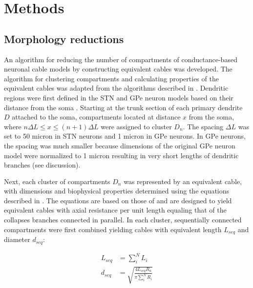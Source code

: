 %
%
%

%
%
%
%
%
%
%
%

%
%
%
%
%
%
%

%
%
%
%
%
%
%
%
%
%
%
%

%
%
%
%
%
%
%
%
%
%
%
%

%
%
%
\section{Methods}
%
%

%
%
%

\subsection{Morphology reductions}

%
%
%
%
%
%
%
%
%


An algorithm for reducing the number of compartments of conductance-based
neuronal cable models by constructing equivalent cables was developed.
The algorithm for clustering compartments and calculating properties
of the equivalent cables was adapted from the algorithms described in
\cite{bush_reduced_1993,marasco_fast_2012,douglas1992exploring}.
%
Dendritic regions were first defined in the STN and GPe neuron models based
on their distance from the soma \cite{douglas1992exploring}. Starting at the trunk section of each
primary dendrite $D$ attached to the soma, compartments located at distance $x$ from the
soma, where $ n \Delta L \leq x \le (n+1) \Delta L $ were assigned to cluster $D_n$.
The spacing $\Delta L$ was set to 50 micron in STN neurons and 1 micron in GPe neurons.
In GPe neurons, the spacing was much smaller because dimensions of the original
\cite{gunay_channel_2008} GPe neuron model were normalized to 1 micron resulting
in very short lengths of dendritic branches (see discussion).
%

%
%
%
%
%
%
%
%
%
%
%
%
%
%
%
%
%
%
%

Next, each cluster of compartments $D_n$ was represented by an equivalent cable,
with dimensions and biophysical properties determined using the equations described
in \cite{marasco_fast_2012}. The equations are based on those of \cite{bush_reduced_1993}
and are designed to yield equivalent cables with axial resistance per unit length equaling
that of the collapses branches connected in parallel. In each cluster, sequentially
connected compartments were first combined yielding cables with equivalent
length $L_{seq}$ and diameter $d_{seq}$:

\begin{align}
    L_{seq} &= \sum_i^N L_i \\
    d_{seq} &= \sqrt{\frac{ 4 L_{seq} R_a }{ \pi \sum_i^N R_i }}
\end{align}

